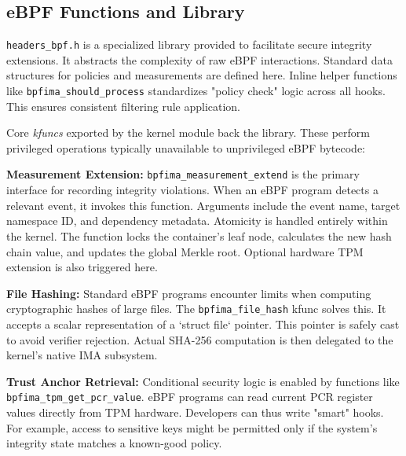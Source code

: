 \subsection{eBPF Functions and Library}
\texttt{headers\_bpf.h} is a specialized library provided to facilitate secure integrity extensions.
It abstracts the complexity of raw \ac{eBPF} interactions.
Standard data structures for policies and measurements are defined here.
Inline helper functions like \texttt{bpfima\_should\_process} standardizes "policy check" logic across all hooks.
This ensures consistent filtering rule application.

Core \textit{kfuncs} exported by the kernel module back the library.
These perform privileged operations typically unavailable to unprivileged \ac{eBPF} bytecode:

\textbf{Measurement Extension:} \texttt{bpfima\_measurement\_extend} is the primary interface for recording integrity violations.
When an \ac{eBPF} program detects a relevant event, it invokes this function.
Arguments include the event name, target namespace ID, and dependency metadata.
Atomicity is handled entirely within the kernel.
The function locks the container's leaf node, calculates the new hash chain value, and updates the global Merkle root.
Optional hardware TPM extension is also triggered here.

\textbf{File Hashing:} Standard \ac{eBPF} programs encounter limits when computing cryptographic hashes of large files.
The \texttt{bpfima\_file\_hash} kfunc solves this.
It accepts a scalar representation of a `struct file` pointer.
This pointer is safely cast to avoid verifier rejection.
Actual SHA-256 computation is then delegated to the kernel's native \ac{IMA} subsystem.

\textbf{Trust Anchor Retrieval:} Conditional security logic is enabled by functions like \texttt{bpfima\_tpm\_get\_pcr\_value}.
\ac{eBPF} programs can read current PCR register values directly from TPM hardware.
Developers can thus write "smart" hooks.
For example, access to sensitive keys might be permitted only if the system's integrity state matches a known-good policy.
